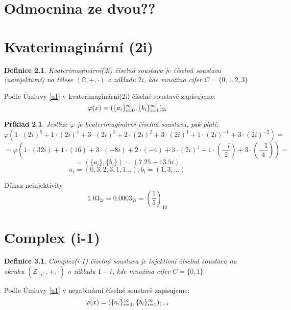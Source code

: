 \documentclass[12pt]{book}
\newtheorem{definice}{Definice}
\newtheorem{pr}{Příklad}
\begin{document}


\chapter{Odmocnina ze dvou??}


\chapter{Kvaterimaginární (2i)}

\begin{definice}
	Kvaterimaginární(2i) číselná soustava je číselná soustava (neinjektivní) na tělese $(\mathbb{C},+,\cdot)$ o základu $2i$, kde množina cifer $C = \{0,1,2,3\}$
\end{definice}

Podle Úmluvy \ref{u1} v kvaterimaginární(2i) číselné soustavě zapisujeme:
$$\varphi(x) = (\{a_i\}_{i=0}^{\infty},\{b_i\}_{i=1}^{\infty})_{2i}$$


\begin{pr}
	Jestliže $\varphi$ je kvaterimaginární číselná soustava, pak platí:
	$$\varphi(1\cdot(2i)^5+1\cdot(2i)^4+3\cdot(2i)^3+2\cdot(2i)^2+3\cdot(2i)^1+1\cdot(2i)^{-1}+3\cdot(2i)^{-2})=$$
	$$=\varphi(1\cdot(32i)+1\cdot(16)+3\cdot(-8i)+2\cdot(-4)+3\cdot(2i)^1+1\cdot(\frac{-i}{2})+3\cdot(\frac{-1}{4}))=$$
	$$=(\{a_i\},\{b_i\})=(7.25+13.5i)$$
	$${a_i}=(0,3,2,3,1,1...),{b_i}=(1,3,...) $$
\end{pr}

Důkaz neinjektivity
$$1.03_{2i} = 0.0003_{2i} = \left(\frac{1}{5}\right)_{10}$$


\chapter{Complex (i-1)}

\begin{definice}
	Complex(i-1) číselná soustava je injektivní číselná soustava na okruhu $(\mathbb{Z}_{[i]},+,\cdot)$ o základu $1-i$, kde množina cifer $C = \{0,1\}$
\end{definice}

Podle Úmluvy \ref{u1} v negabinární číselné soustavě zapisujeme:
$$\varphi(x) = (\{a_i\}_{i=0}^{\infty},\{b_i\}_{i=1}^{\infty})_{1-i}$$
\end{document}
